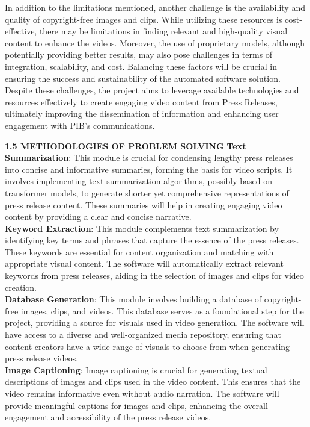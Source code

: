 \documentclass[12pt]{article}
\begin{document}
In addition to the limitations mentioned, another challenge is the availability and quality of copyright-free images and clips. While utilizing these resources is cost-effective, there may be limitations in finding relevant and high-quality visual content to enhance the videos. Moreover, the use of proprietary models, although potentially providing better results, may also pose challenges in terms of integration, scalability, and cost. Balancing these factors will be crucial in ensuring the success and sustainability of the automated software solution. Despite these challenges, the project aims to leverage available technologies and resources effectively to create engaging video content from Press Releases, ultimately improving the dissemination of information and enhancing user engagement with PIB's communications.


\noindent  
\pagebreak


\noindent \fontsize{12}{12} \textbf{1.5 METHODOLOGIES OF PROBLEM SOLVING}
\justify
\hspace{5mm} \textbf{Text Summarization}: This module is crucial for condensing lengthy press releases into concise and informative summaries, forming the basis for video scripts. It involves implementing text summarization algorithms, possibly based on transformer models, to generate shorter yet comprehensive representations of press release content. These summaries will help in creating engaging video content by providing a clear and concise narrative.\\

\textbf{Keyword Extraction}: This module complements text summarization by identifying key terms and phrases that capture the essence of the press releases. These keywords are essential for content organization and matching with appropriate visual content. The software will automatically extract relevant keywords from press releases, aiding in the selection of images and clips for video creation.\\

\textbf{Database Generation}: This module involves building a database of copyright-free images, clips, and videos. This database serves as a foundational step for the project, providing a source for visuals used in video generation. The software will have access to a diverse and well-organized media repository, ensuring that content creators have a wide range of visuals to choose from when generating press release videos.\\

\textbf{Image Captioning}: Image captioning is crucial for generating textual descriptions of images and clips used in the video content. This ensures that the video remains informative even without audio narration. The software will provide meaningful captions for images and clips, enhancing the overall engagement and accessibility of the press release videos.\\
\end{document}

